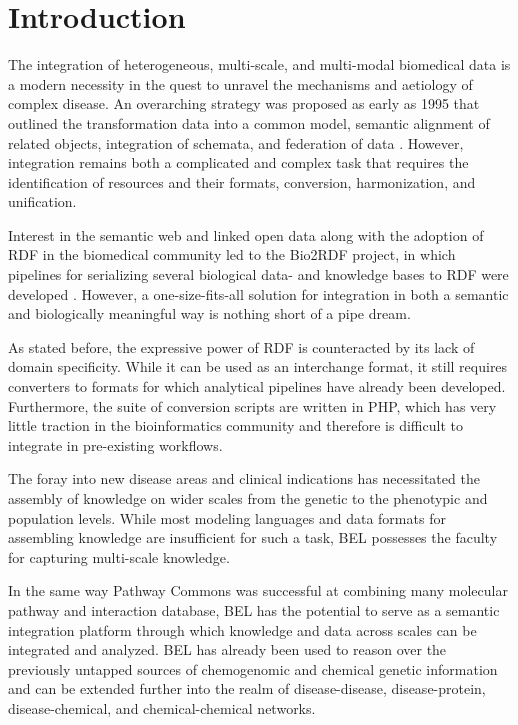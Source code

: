 \documentclass{bioinfo}
\begin{document}
\section{Introduction}

The integration of heterogeneous, multi-scale, and multi-modal biomedical data is a modern necessity in the quest to unravel the mechanisms and aetiology of complex disease. 
An overarching strategy was proposed as early as 1995 that outlined the transformation data into a common model, semantic alignment of related objects, integration of schemata, and federation of data \citep{Davidson1995}.
However, integration remains both a complicated and complex task that requires the identification of resources and their formats, conversion, harmonization, and unification.

Interest in the semantic web and linked open data along with the adoption of RDF in the biomedical community led to the Bio2RDF project, in which pipelines for serializing several biological data- and knowledge bases to RDF were developed \citep{Belleau2008}. However, a one-size-fits-all solution for integration in both a semantic and biologically meaningful way is nothing short of a pipe dream. 

As stated before, the expressive power of RDF is counteracted by its lack of domain 
specificity. While it can be used as an interchange format, it still requires converters 
to formats for which analytical pipelines have already been developed. Furthermore, the 
suite of conversion scripts are written in PHP, which has very little traction in the 
bioinformatics community and therefore is difficult to integrate in pre-existing workflows. 


The foray into new disease areas and clinical indications has necessitated the assembly of knowledge on wider scales from the genetic to the phenotypic and population levels. While most modeling languages and data formats for assembling knowledge are insufficient for such a task, BEL possesses the faculty for capturing multi-scale knowledge.

In the same way Pathway Commons was successful at combining many molecular pathway and interaction database, BEL has the potential to serve as a semantic integration platform through which knowledge and data across scales can be integrated and analyzed. BEL has already been used to reason over the previously untapped sources of chemogenomic and chemical genetic information  \citep{Emon2017} and can be extended further into the realm of disease-disease, disease-protein, disease-chemical, and chemical-chemical networks.
\end{document}
